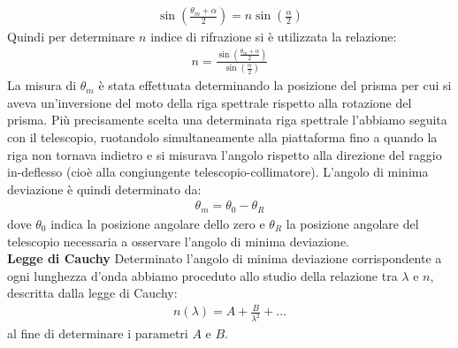 \documentclass[a4paper]{article}
\begin{document}
\begin{align}
    \sin(\frac{\theta_m + \alpha}{2}) = n\sin(\frac{\alpha}{2})
\label{eq:angolo min deviazione}
\end{align}
Quindi per determinare $n$ indice di rifrazione si è utilizzata la relazione:
\begin{align}
    n= \frac{\sin(\frac{\theta_m + \alpha}{2})}{\sin(\frac{\alpha}{2})}
\label{eq:indice di rifrazione}
\end{align}
La misura di $\theta_m$ è stata effettuata determinando la posizione del prisma per cui si aveva un'inversione del moto della riga spettrale rispetto alla rotazione del prisma. Più precisamente scelta una determinata riga spettrale l'abbiamo seguita con il telescopio, ruotandolo simultaneamente alla piattaforma fino a quando la riga non tornava indietro e si misurava l'angolo rispetto alla direzione del raggio in-deflesso (cioè alla congiungente telescopio-collimatore). L'angolo di minima deviazione è quindi determinato da: 
\begin{align}
    \theta_m = \theta_0-\theta_R
\label{eq:posizione zero}
\end{align}
dove $\theta_0$ indica la posizione angolare dello zero e $\theta_R$ la posizione angolare del telescopio necessaria a osservare l'angolo di minima deviazione.
\newline\\
\textbf{Legge di Cauchy} \newline
Determinato l'angolo di minima deviazione corrispondente a ogni lunghezza d'onda abbiamo proceduto allo studio della relazione tra $\lambda$ e $n$, descritta dalla legge di Cauchy:
\begin{align}
    n(\lambda) = A + \frac{B}{\lambda^2} + ...
\label{eq:Cauchy}
\end{align}
al fine di determinare i parametri $A$ e $B$.
\end{document}
